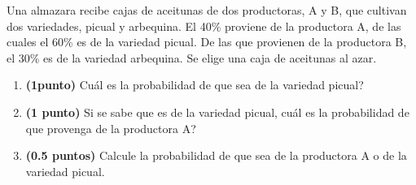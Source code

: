 
Una almazara recibe cajas de aceitunas de dos productoras, A y B, que cultivan dos variedades, picual y arbequina. El 40\% proviene de la productora A, de las cuales el 60\% es de la variedad picual. De las que provienen de la productora B, el 30\% es de la variedad arbequina. Se elige una caja de aceitunas al azar.
\begin{enumerate}[label=\alph*)]
\item \textbf{(1punto)} \textquestiondown{}Cuál es la probabilidad de que sea de la variedad picual?
\item \textbf{(1 punto)} Si se sabe que es de la variedad picual, \textquestiondown{}cuál es la probabilidad de que provenga de la productora A?
\item \textbf{(0.5 puntos)} Calcule la probabilidad de que sea de la productora A o de la variedad picual.
\end{enumerate}
